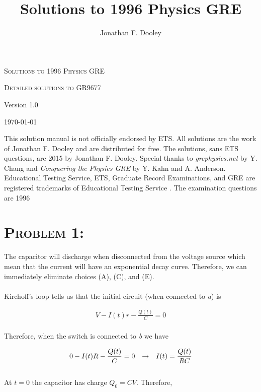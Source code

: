 \documentclass{article}
\title{Solutions to 1996 Physics GRE}
\author{Jonathan F. Dooley}
\begin{document}
\begin{titlepage}
\centering
{\scshape\LARGE Solutions to 1996 Physics GRE \par}
\vspace{.5cm}

{\scshape\Large Detailed solutions to GR9677\par}
\vspace{6cm}

{\huge Version 1.0 \par}
\vspace{1cm}
{\large \today\par}
\vspace{6cm}

This solution manual is not officially endorsed by ETS. All solutions are the work of Jonathan F. Dooley and are distributed for free. The solutions, sans ETS questions, are \textcopyright  \hspace{.001in} 2015 by Jonathan F. Dooley. Special thanks to \textit{grephysics.net} by Y. Chang and \textit{Conquering the Physics GRE} by Y. Kahn and A. Anderson. Educational Testing Service, ETS, Graduate Record Examinations, and GRE are registered trademarks of Educational Testing Service \hspace{.001in} \textregistered. The examination questions are \textcopyright  \hspace{.001in} 1996 
\end{titlepage}


\section{\textsc{Problem 1:}} The capacitor will discharge when disconnected from the voltage source which mean that the current will have an exponential decay curve. Therefore, we can immediately eliminate choices (A), (C), and (E).\\\\
Kirchoff's loop tells us that the initial circuit (when connected to \textit{a}) is

\begin{gather}
V - I(t) r - \frac{Q(t)}{C} = 0
\end{gather}
\\
Therefore, when the switch is connected to \textit{b} we have

\begin{gather}
0 - I(t) R - \frac{Q(t)}{C} = 0 \hspace{.1in} \rightarrow \hspace{.1in} I(t) = \frac{Q(t)}{RC} \nonumber
\end{gather}
\\
At $t = 0$ the capacitor has charge $Q_{0} = CV$. Therefore, 
\end{document}
